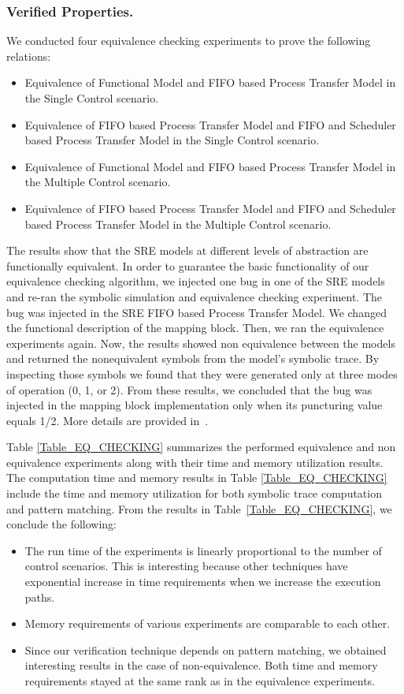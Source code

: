 \documentclass[submission,copyright,creativecommons]{eptcs}
\begin{document}
\subsubsection{Verified Properties.}

We conducted four equivalence checking experiments to prove the following relations:
\begin{itemize}
  \item Equivalence of Functional Model and FIFO based Process Transfer Model in the Single Control scenario.
  \item Equivalence of FIFO based Process Transfer Model and FIFO and Scheduler based Process Transfer Model in the Single Control scenario.
  \item Equivalence of Functional Model and FIFO based Process Transfer Model in the Multiple Control scenario.
  \item Equivalence of FIFO based Process Transfer Model and FIFO and Scheduler based Process Transfer Model in the Multiple Control scenario.
\end{itemize}
The results show that the SRE models at different levels of abstraction are functionally equivalent. In order to guarantee the basic functionality of our equivalence checking algorithm, we injected one bug in one of the SRE models and re-ran the symbolic simulation and equivalence checking experiment. The bug was injected in the SRE FIFO based Process Transfer Model. We changed the functional description of the mapping block. Then, we ran the equivalence experiments again. Now, the results showed non equivalence between the models and returned the nonequivalent symbols from the model's symbolic trace. By inspecting those symbols we found that they were generated only at three modes of operation (0, 1, or 2). From these results, we concluded that the bug was injected in the mapping block implementation only when its puncturing value equals 1/2. More details are provided in~\cite{saleem_masters_thesis}.

Table \ref{Table_EQ_CHECKING} summarizes the performed equivalence and non equivalence experiments along with their time and memory utilization results. The computation time and memory results in Table \ref{Table_EQ_CHECKING} include the time and memory utilization for both symbolic trace computation and pattern matching. From the results in Table~\ref{Table_EQ_CHECKING}, we conclude the following:
\begin{itemize}
  \item The run time of the experiments is linearly proportional to the number of control scenarios. This is interesting because other techniques have exponential increase in time requirements when we increase the execution paths.
  \item Memory requirements of various experiments are comparable to each other.
  \item Since our verification technique depends on pattern matching, we obtained interesting results in the case of non-equivalence. Both time and memory requirements stayed at the same rank as in the equivalence experiments.
\end{itemize}
\end{document}
